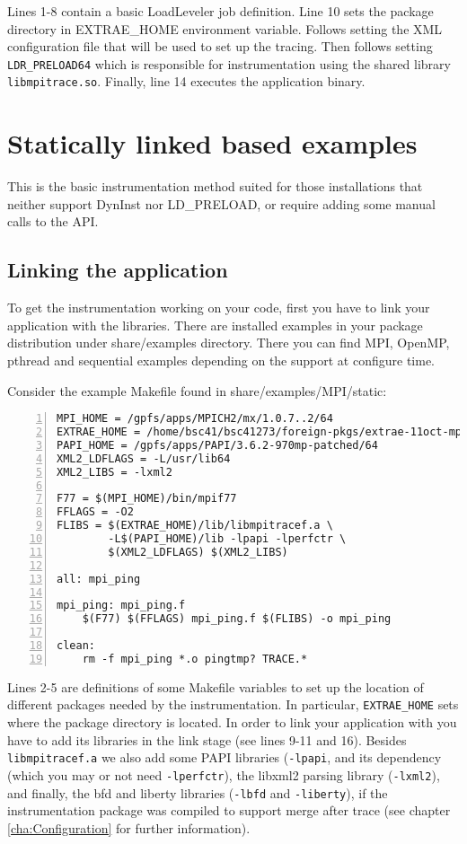 Lines 1-8 contain a basic LoadLeveler job definition. Line 10 sets the \TRACE package directory in EXTRAE\_HOME environment variable. Follows setting the XML configuration file that will be used to set up the tracing. Then follows setting {\tt LDR\_PRELOAD64} which is responsible for instrumentation using the shared library {\tt libmpitrace.so}. Finally, line 14 executes the application binary.

\section{Statically linked based examples}\label{sec:Examples_static}

This is the basic instrumentation method suited for those installations that neither support DynInst nor LD\_PRELOAD, or require adding some manual calls to the \TRACE API.

\subsection{Linking the application}\label{subsec:Examples_static_link}

To get the instrumentation working on your code, first you have to link your application with the \TRACE libraries. There are installed examples in your package distribution under share/examples directory. There you can find MPI, OpenMP, pthread and sequential examples depending on the support at configure time.

Consider the example Makefile found in share/examples/MPI/static:

\begin{Verbatim}[frame=single,numbers=left,labelposition=topline,label=Makefile]
MPI_HOME = /gpfs/apps/MPICH2/mx/1.0.7..2/64
EXTRAE_HOME = /home/bsc41/bsc41273/foreign-pkgs/extrae-11oct-mpich2/64
PAPI_HOME = /gpfs/apps/PAPI/3.6.2-970mp-patched/64
XML2_LDFLAGS = -L/usr/lib64
XML2_LIBS = -lxml2

F77 = $(MPI_HOME)/bin/mpif77 
FFLAGS = -O2
FLIBS = $(EXTRAE_HOME)/lib/libmpitracef.a \
        -L$(PAPI_HOME)/lib -lpapi -lperfctr \
        $(XML2_LDFLAGS) $(XML2_LIBS)

all: mpi_ping

mpi_ping: mpi_ping.f
	$(F77) $(FFLAGS) mpi_ping.f $(FLIBS) -o mpi_ping

clean:
	rm -f mpi_ping *.o pingtmp? TRACE.*
\end{Verbatim}

Lines 2-5 are definitions of some Makefile variables to set up the location of different packages needed by the instrumentation. In particular, {\tt EXTRAE\_HOME} sets where the \TRACE package directory is located. In order to link your application with \TRACE you have to add its libraries in the link stage (see lines 9-11 and 16). Besides {\tt libmpitracef.a} we also add some PAPI libraries ({\tt -lpapi}, and its dependency (which you may or not need {\tt -lperfctr}), the libxml2 parsing library ({\tt -lxml2}), and finally, the bfd and liberty libraries ({\tt -lbfd} and {\tt -liberty}), if the instrumentation package was compiled to support merge after trace (see chapter \ref{cha:Configuration} for further information).

